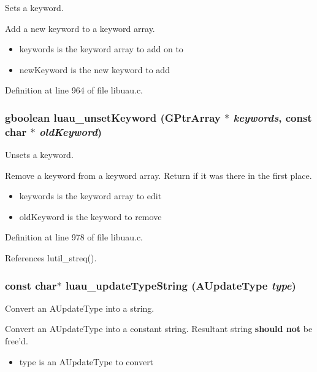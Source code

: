 Sets a keyword. 

Add a new keyword to a keyword array.

\begin{itemize}
\item keywords is the keyword array to add on to \item new\-Keyword is the new keyword to add \end{itemize}


Definition at line 964 of file libuau.c.
\subsubsection{\setlength{\rightskip}{0pt plus 5cm}gboolean luau\_\-unset\-Keyword (GPtr\-Array $\ast$ {\em keywords}, const char $\ast$ {\em old\-Keyword})}\label{libuau_8h_a79}


Unsets a keyword. 

Remove a keyword from a keyword array. Return if it was there in the first place.

\begin{itemize}
\item keywords is the keyword array to edit \item old\-Keyword is the keyword to remove 
\end{itemize}


Definition at line 978 of file libuau.c.

References lutil\_\-streq().
\subsubsection{\setlength{\rightskip}{0pt plus 5cm}const char$\ast$ luau\_\-update\-Type\-String ({\bf AUpdate\-Type} {\em type})}\label{libuau_8h_a68}


Convert an AUpdate\-Type into a string. 

Convert an AUpdate\-Type into a constant string. Resultant string {\bf should not} be free'd.

\begin{itemize}
\item type is an AUpdate\-Type to convert 
\end{itemize}


